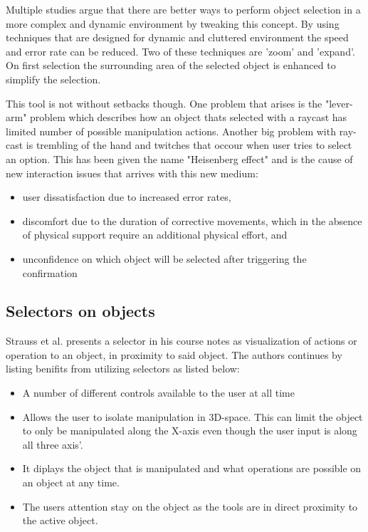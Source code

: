 Multiple studies argue that there are better ways to perform object selection in a more complex and dynamic environment by tweaking this concept.\cite{selection:Argelaguet2008,interactions:Bowman1997} By using techniques that are designed for dynamic and cluttered environment the speed and error rate can be reduced. Two of these techniques are 'zoom' and 'expand'. On first selection the surrounding area of the selected object is enhanced to simplify the selection.

This tool is not without setbacks though. One problem that arises is the "lever-arm" problem which describes how an object thats selected with a raycast has limited number of possible manipulation actions.\cite{interactions:Poupyrev1996} Another big problem with ray-cast is trembling of the hand and twitches that occour when user tries to select an option. This has been given the name "Heisenberg effect" and is the cause of new interaction issues that arrives with this new medium\cite{selection:Bowman2001}:

\begin{itemize}
\item user dissatisfaction due to increased error rates,
\item discomfort due to the duration of corrective movements, which in the absence of physical support require an additional physical effort, and
\item unconfidence on which object will be selected after triggering the confirmation
\end{itemize}

\subsection{Selectors on objects}
\label{theory:toolsandtech:selector}
Strauss et al. presents a selector in his course notes\cite{tools:strauss2002design} as visualization of actions or operation to an object, in proximity to said object. The authors continues by listing benifits from utilizing selectors as listed below:
\begin{itemize}
  \item A number of different controls available to the user at all time
  \item Allows the user to isolate manipulation in 3D-space. This can limit the object to only be manipulated along the X-axis even though the user input is along all three axis'.
  \item It diplays the object that is manipulated and what operations are possible on an object at any time.
  \item The users attention stay on the object as the tools are in direct proximity to the active object.

\end{itemize}

